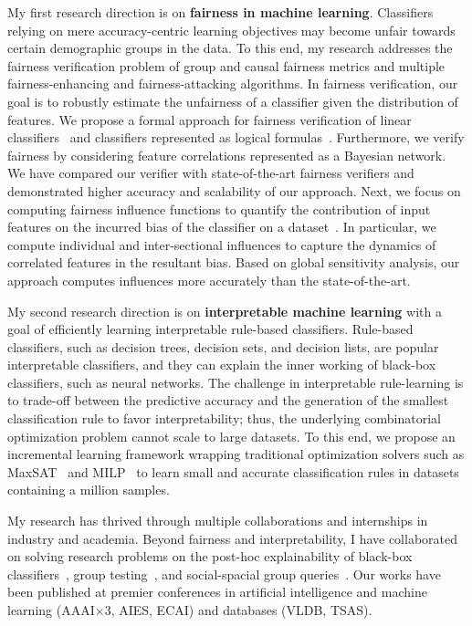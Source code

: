 \documentclass[10pt]{article}
\begin{document}
	My first research direction is on \textbf{fairness in machine learning}. Classifiers relying on mere accuracy-centric learning objectives may become unfair towards certain demographic groups in the data. To this end, my research addresses the fairness verification problem of group and causal fairness metrics and multiple fairness-enhancing and fairness-attacking algorithms. In fairness verification, our goal is to robustly estimate the unfairness of a classifier given the distribution of features. We propose a formal approach for fairness verification of linear classifiers~\cite{ghosh2021algorithmic} and classifiers represented as logical formulas~\cite{ghosh2020justicia}. Furthermore, we verify fairness by considering feature correlations represented as a Bayesian network. We have compared our verifier with state-of-the-art fairness verifiers and demonstrated higher accuracy and scalability of our approach. Next, we focus on computing fairness influence functions to quantify the contribution of input features on the incurred bias of the classifier on a dataset~\cite{ghosh2021how}. In particular, we compute individual and inter-sectional influences to capture the dynamics of correlated features in the resultant bias. Based on global sensitivity analysis, our approach computes influences more accurately than the state-of-the-art. 
	
	My second research direction is on \textbf{interpretable machine learning} with a goal of efficiently learning interpretable rule-based classifiers. Rule-based classifiers, such as decision trees, decision sets, and decision lists, are popular interpretable classifiers, and they can explain the inner working of black-box classifiers, such as neural networks. The challenge in interpretable rule-learning is to trade-off between the predictive accuracy and the generation of the smallest classification rule to favor interpretability; thus, the underlying combinatorial optimization problem cannot scale to large datasets. To this end, we propose an incremental learning framework wrapping traditional optimization solvers such as  MaxSAT~\cite{ghosh19incremental,ghosh19efficient} and MILP~\cite{ghosh20classification} to learn small and accurate classification rules in datasets containing a million samples.
	
	My research has thrived through multiple collaborations and internships in industry and academia. Beyond fairness and interpretability, I have collaborated on solving research problems on the post-hoc explainability of black-box classifiers~\cite{ghosh2020formal,neider2020probably}, group testing~\cite{ciampiconi20maxsat}, and social-spacial group queries~\cite{ghosh18flexible,apon2021social}. Our works have been published at premier conferences in artificial intelligence and machine learning (AAAI$ \times 3$, AIES, ECAI) and databases (VLDB, TSAS).
	
\end{document}
